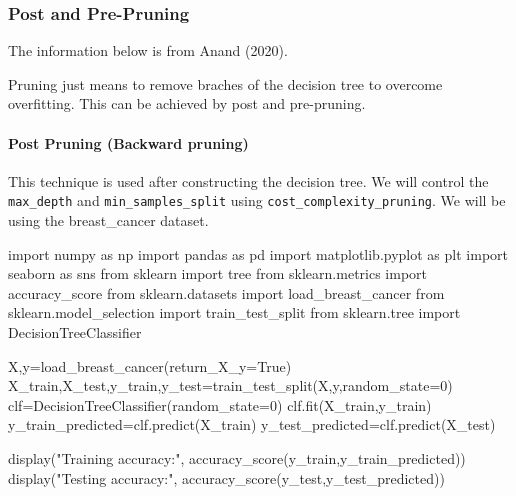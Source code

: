 \documentclass[
  letterpaper,
  DIV=11,
  numbers=noendperiod]{scrartcl}
\let\oldparagraph\paragraph
\renewcommand{\paragraph}[1]{\oldparagraph{#1}\mbox{}}
\newenvironment{Shaded}{\begin{snugshade}}{\end{snugshade}}
\newcommand{\DecValTok}[1]{\textcolor[rgb]{0.68,0.00,0.00}{#1}}
\newcommand{\ImportTok}[1]{\textcolor[rgb]{0.00,0.46,0.62}{#1}}
\newcommand{\NormalTok}[1]{\textcolor[rgb]{0.00,0.23,0.31}{#1}}
\newcommand{\OperatorTok}[1]{\textcolor[rgb]{0.37,0.37,0.37}{#1}}
\newcommand{\StringTok}[1]{\textcolor[rgb]{0.13,0.47,0.30}{#1}}
\newcommand{\VariableTok}[1]{\textcolor[rgb]{0.07,0.07,0.07}{#1}}
\begin{document}
\subsubsection{Post and Pre-Pruning}\label{post-and-pre-pruning}

The information below is from Anand (2020).

Pruning just means to remove braches of the decision tree to overcome
overfitting. This can be achieved by post and pre-pruning.

\paragraph{Post Pruning (Backward
pruning)}\label{post-pruning-backward-pruning}

This technique is used after constructing the decision tree. We will
control the \texttt{max\_depth} and \texttt{min\_samples\_split} using
\texttt{cost\_complexity\_pruning}. We will be using the breast\_cancer
dataset.

\begin{Shaded}
\begin{Highlighting}[]
\ImportTok{import}\NormalTok{ numpy }\ImportTok{as}\NormalTok{ np}
\ImportTok{import}\NormalTok{ pandas }\ImportTok{as}\NormalTok{ pd}
\ImportTok{import}\NormalTok{ matplotlib.pyplot }\ImportTok{as}\NormalTok{ plt}
\ImportTok{import}\NormalTok{ seaborn }\ImportTok{as}\NormalTok{ sns}
\ImportTok{from}\NormalTok{ sklearn }\ImportTok{import}\NormalTok{ tree}
\ImportTok{from}\NormalTok{ sklearn.metrics }\ImportTok{import}\NormalTok{ accuracy\_score}
\ImportTok{from}\NormalTok{ sklearn.datasets }\ImportTok{import}\NormalTok{ load\_breast\_cancer}
\ImportTok{from}\NormalTok{ sklearn.model\_selection }\ImportTok{import}\NormalTok{ train\_test\_split}
\ImportTok{from}\NormalTok{ sklearn.tree }\ImportTok{import}\NormalTok{ DecisionTreeClassifier}
\end{Highlighting}
\end{Shaded}

\begin{Shaded}
\begin{Highlighting}[]
\NormalTok{X,y}\OperatorTok{=}\NormalTok{load\_breast\_cancer(return\_X\_y}\OperatorTok{=}\VariableTok{True}\NormalTok{)}
\NormalTok{X\_train,X\_test,y\_train,y\_test}\OperatorTok{=}\NormalTok{train\_test\_split(X,y,random\_state}\OperatorTok{=}\DecValTok{0}\NormalTok{)}
\NormalTok{clf}\OperatorTok{=}\NormalTok{DecisionTreeClassifier(random\_state}\OperatorTok{=}\DecValTok{0}\NormalTok{)}
\NormalTok{clf.fit(X\_train,y\_train)}
\NormalTok{y\_train\_predicted}\OperatorTok{=}\NormalTok{clf.predict(X\_train)}
\NormalTok{y\_test\_predicted}\OperatorTok{=}\NormalTok{clf.predict(X\_test)}

\NormalTok{display(}\StringTok{"Training accuracy:"}\NormalTok{, accuracy\_score(y\_train,y\_train\_predicted))}
\NormalTok{display(}\StringTok{"Testing accuracy:"}\NormalTok{, accuracy\_score(y\_test,y\_test\_predicted))}
\end{Highlighting}
\end{Shaded}
\end{document}
